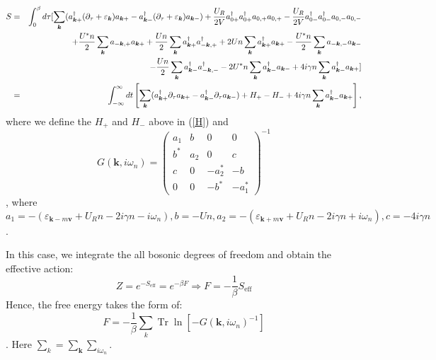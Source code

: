 \documentclass{article}
\newcommand{\nobracket}{}
\newcommand{\tmmathbf}[1]{\ensuremath{\boldsymbol{#1}}}
\newcommand{\tmop}[1]{\ensuremath{\operatorname{#1}}}
\begin{document}
\begin{eqnarray}
  S & = & \int_0^{\beta} d \tau [\nobracket \sum_{\tmmathbf{k}}
  (a^{\dagger}_{\tmmathbf{k}+} (\partial_{\tau} + \varepsilon_{\tmmathbf{k}})
  a_{\tmmathbf{k}+} - a^{\dagger}_{\tmmathbf{k}-} (\partial_{\tau} +
  \varepsilon_{\tmmathbf{k}}) a_{\tmmathbf{k}-}) + \frac{U_R}{2 V} a_{0
  +}^{\dagger} a_{0 +}^{\dagger} a_{0, +} a_{0, +} - \frac{U_R}{2 V} a_{0
  -}^{\dagger} a_{0 -}^{\dagger} a_{0, -} a_{0, -} \nonumber\\
  &  & + \frac{U^{\ast} n}{2} \sum_{\tmmathbf{k}} a_{-\tmmathbf{k}, +}
  a_{\tmmathbf{k}+} + \frac{U n}{2} \sum_{\tmmathbf{k}}
  a_{\tmmathbf{k}+}^{\dagger} a_{-\tmmathbf{k}, +}^{\dagger} + 2 U n
  \sum_{\tmmathbf{k}} a_{\tmmathbf{k}+}^{\dagger} a_{\tmmathbf{k}+} -
  \frac{U^{\ast} n}{2} \sum_{\tmmathbf{k}} a_{-\tmmathbf{k}, -}
  a_{\tmmathbf{k}-} \nonumber\\
  &  & - \frac{U n}{2} \sum_{\tmmathbf{k}} a_{\tmmathbf{k}-}^{\dagger}
  a_{-\tmmathbf{k}, -}^{\dagger} - 2 U^{\ast} n \sum_{\tmmathbf{k}}
  a_{\tmmathbf{k}-}^{\dagger} a_{\tmmathbf{k}-} + 4 i \gamma n
  \sum_{\tmmathbf{k}} a_{\tmmathbf{k}-}^{\dagger} a_{\tmmathbf{k}+}
  \large{\large{}] \nobracket} \\
  & = & \int_{- \infty}^{\infty} d t \left[ \sum_{\tmmathbf{k}}
  (a^{\dagger}_{\tmmathbf{k}+} \partial_{\tau} a_{\tmmathbf{k}+} -
  a^{\dagger}_{\tmmathbf{k}-} \partial_{\tau} a_{\tmmathbf{k}-}) + H_+ - H_- +
  4 i \gamma n \sum_{\tmmathbf{k}} a_{\tmmathbf{k}-}^{\dagger}
  a_{\tmmathbf{k}+} \right], 
\end{eqnarray}
where we define the $H_+$ and $H_-$ above in (\ref{H}) and
\begin{equation}
  G (\tmmathbf{k}, i \omega_n) = \left(\begin{array}{cccc}
    a_1 & b & 0 & 0\\
    b^{\ast} & a_2 & 0 & c\\
    c & 0 & - a_2^{\ast} & - b\\
    0 & 0 & - b^{\ast} & - a_1^{\ast}
  \end{array}\right)^{- 1} \label{Green2}
\end{equation}
, where $a_1 = - (\varepsilon_{\tmmathbf{k}- m\tmmathbf{v}} + U_R n - 2 i
\gamma n - i \omega_n), b = - U n, a_2 = - (\varepsilon_{\tmmathbf{k}+
m\tmmathbf{v}} + U_R n - 2 i \gamma n + i \omega_n), c = - 4 i \gamma n$.

In this case, we integrate the all bosonic degrees of freedom and obtain the
effective action:
\begin{equation}
  Z = e^{- S_{\tmop{eff}}} = e^{- \beta F} \Rightarrow F = - \frac{1}{\beta}
  S_{\tmop{eff}}
\end{equation}
Hence, the free energy takes the form of:
\begin{equation}
  F = - \frac{1}{\beta} \sum_k \tmop{Tr} \ln [- G (\tmmathbf{k}, i
  \omega_n)^{- 1}]
\end{equation}
. Here $\sum_k = \sum_{\tmmathbf{k}} \sum_{i \omega_n}$.
\end{document}
